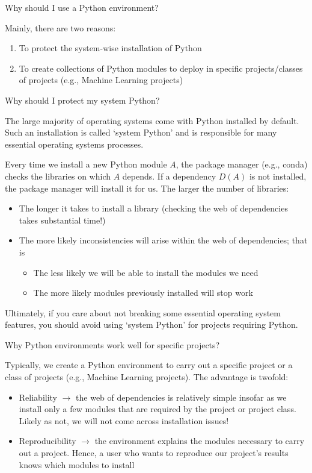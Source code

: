\documentclass[a4paper,11pt]{book}
\newcommand{\question}[1]{%
    \begin{tcolorbox}[colback=comp_c!10,colframe=comp_c,sidebyside align=top,width=\linewidth,before skip=1ex]
        #1
    \end{tcolorbox}
    \switchcolumn%
}
\newcommand{\note}[1]{%
    \begin{tcolorbox}[colback=white!0,colframe=white!10,width=\linewidth,before skip=1ex]
        #1
    \end{tcolorbox}
}
\begin{document}
\begin{paracol}{2}
	\question{\raggedright Why should I use a Python environment?}
	\note{Mainly, there are two reasons:
	\begin{enumerate}
		\item To protect the system-wise installation of Python
		\item To create collections of Python modules to deploy in specific projects/classes of projects (e.g., Machine Learning projects)
	\end{enumerate}
	}
\end{paracol}

\begin{paracol}{2}
	\question{\raggedright Why should I protect my system Python?}
	\note{
	The large majority of operating systems come with Python installed by default. Such an installation is called `system Python' and is responsible for many essential operating systems processes. 

	\quad Every time we install a new Python module $A$, the package manager (e.g., conda) checks the libraries on which $A$ depends. If a dependency $D(A)$ is not installed, the package manager will install it for us. The larger the number of libraries:
	\begin{itemize}
		\item The longer it takes to install a library (checking the web of dependencies takes substantial time!)
		\item The more likely inconsistencies will arise within the web of dependencies; that is
		\begin{itemize}
		\item The less likely we will be able to install the modules we need
		\item The more likely modules previously installed will stop work
		\end{itemize}
	\end{itemize}
	Ultimately, if you care about not breaking some essential operating system features, you should avoid using `system Python' for projects requiring Python.
	}
\end{paracol}
\clearpage

\begin{paracol}{2}
	\question{\raggedright Why Python environments work well for specific projects?}
	\note{
	Typically, we create a Python environment to carry out a specific project or a class of projects (e.g., Machine Learning projects). The advantage is twofold:
	\begin{itemize}
		\item Reliability $\rightarrow$ the web of dependencies is relatively simple insofar as we install only a few modules that are required by the project or project class. Likely as not, we will not come across installation issues!
		\item Reproducibility $\rightarrow$ the environment explains the modules necessary to carry out a project. Hence, a user who wants to reproduce our project's results knows which modules to install
	\end{itemize}
	}
\end{paracol}
\end{document}
